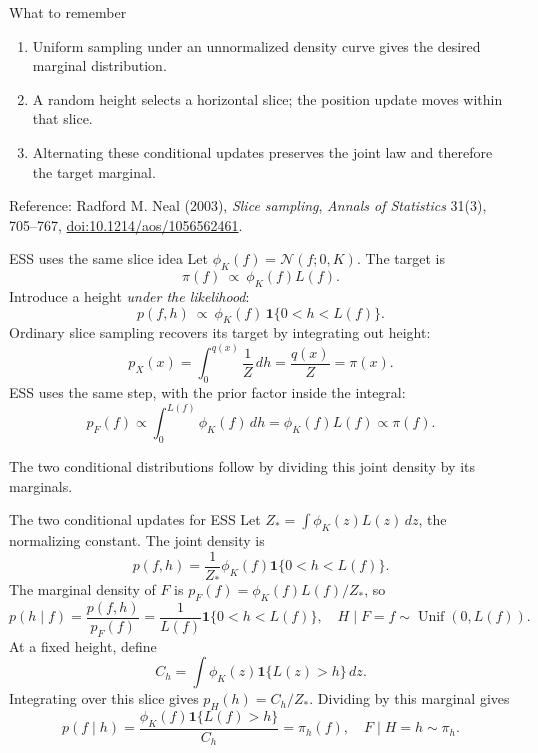 \documentclass[aspectratio=169,11pt]{beamer}
\begin{document}
\begin{frame}{What to remember}
  \begin{enumerate}
    \setlength{\itemsep}{0.8em}
    \item Uniform sampling under an unnormalized density curve
          gives the desired marginal distribution.
    \item A random height selects a horizontal slice; the position
          update moves within that slice.
    \item Alternating these conditional updates preserves the joint
          law and therefore the target marginal.
  \end{enumerate}
  \vspace{0.5em}

  {\small Reference: Radford M. Neal (2003),
  \emph{Slice sampling}, \emph{Annals of Statistics}
  31(3), 705--767,
  \href{https://doi.org/10.1214/aos/1056562461}{doi:10.1214/aos/1056562461}.}
\end{frame}


\begin{frame}{ESS uses the same slice idea}
  Let \(\phi_K(f)=\mathcal N(f;0,K)\). The target is
  \[
    \pi(f)\ \propto\ \phi_K(f)L(f).
  \]
  Introduce a height \emph{under the likelihood}:
  \[
    p(f,h)\ \propto\
      \phi_K(f)\,\mathbf 1\{0<h<L(f)\}.
  \]
  Ordinary slice sampling recovers its target by integrating out height:
  \[
    p_X(x)=\int_0^{q(x)}\frac{1}{Z}\,dh
      =\frac{q(x)}{Z}=\pi(x).
  \]
  ESS uses the same step, with the prior factor inside the integral:
  \[
    p_F(f)\propto\int_0^{L(f)}\phi_K(f)\,dh
      =\phi_K(f)L(f)\propto\pi(f).
  \]

  The two conditional distributions follow by dividing this joint
  density by its marginals.
\end{frame}

\begin{frame}{The two conditional updates for ESS}
  Let \(Z_* = \int \phi_K(z)L(z)\,dz\), the normalizing constant.
  The joint density is
  \[
    p(f,h)=\frac{1}{Z_*}\phi_K(f)\mathbf 1\{0<h<L(f)\}.
  \]
  The marginal density of \(F\) is \(p_F(f)=\phi_K(f)L(f)/Z_*\), so
  \[
    p(h\mid f)=\frac{p(f,h)}{p_F(f)}
      =\frac{1}{L(f)}\mathbf 1\{0<h<L(f)\},\quad
    H\mid F=f\sim \operatorname{Unif}(0,L(f)).
  \]
  At a fixed height, define
  \[
    C_h=\int \phi_K(z)\mathbf 1\{L(z)>h\}\,dz.
  \]
  Integrating over this slice gives \(p_H(h)=C_h/Z_*\).
  Dividing by this marginal gives
  \[
    p(f\mid h)=\frac{\phi_K(f)\mathbf 1\{L(f)>h\}}{C_h}
      =\pi_h(f),\quad F\mid H=h\sim\pi_h.
  \]
\end{frame}
\end{document}

